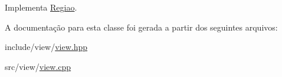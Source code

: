 Implementa \hyperlink{classRegiao_a933b73213efc9221a5dd009f76bee512}{Regiao}.



A documentação para esta classe foi gerada a partir dos seguintes arquivos:\begin{DoxyCompactItemize}
\item 
include/view/\hyperlink{view_8hpp}{view.hpp}\item 
src/view/\hyperlink{view_8cpp}{view.cpp}\end{DoxyCompactItemize}
